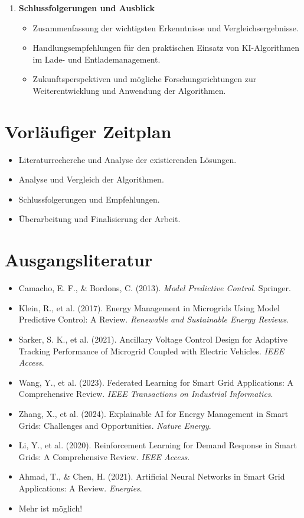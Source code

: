 \documentclass[12pt]{article} %
\begin{document}
\begin{enumerate}
    \item \textbf{Schlussfolgerungen und Ausblick}
        \begin{itemize}
            \item Zusammenfassung der wichtigsten Erkenntnisse und Vergleichsergebnisse.
            \item Handlungsempfehlungen für den praktischen Einsatz von KI-Algorithmen im Lade- und Entlademanagement.
            \item Zukunftsperspektiven und mögliche Forschungsrichtungen zur Weiterentwicklung und Anwendung der Algorithmen.
        \end{itemize}
        
\end{enumerate}




\section{Vorläufiger Zeitplan}

\begin{itemize}
\item Literaturrecherche und Analyse der existierenden Lösungen.
\item Analyse und Vergleich der Algorithmen.
\item Schlussfolgerungen und Empfehlungen.
\item Überarbeitung und Finalisierung der Arbeit.
\end{itemize}




\section{Ausgangsliteratur}

\begin{itemize}
    \item Camacho, E. F., & Bordons, C. (2013). \textit{Model Predictive Control}. Springer.
    \item Klein, R., et al. (2017). Energy Management in Microgrids Using Model Predictive Control: A Review. \textit{Renewable and Sustainable Energy Reviews}.
    \item Sarker, S. K., et al. (2021). Ancillary Voltage Control Design for Adaptive Tracking Performance of Microgrid Coupled with Electric Vehicles. \textit{IEEE Access}.
    \item Wang, Y., et al. (2023). Federated Learning for Smart Grid Applications: A Comprehensive Review. \textit{IEEE Transactions on Industrial Informatics}.
    \item Zhang, X., et al. (2024). Explainable AI for Energy Management in Smart Grids: Challenges and Opportunities. \textit{Nature Energy}.
    \item Li, Y., et al. (2020). Reinforcement Learning for Demand Response in Smart Grids: A Comprehensive Review. \textit{IEEE Access}.
    \item Ahmad, T., & Chen, H. (2021). Artificial Neural Networks in Smart Grid Applications: A Review. \textit{Energies}.
    \item Mehr ist möglich!
\end{itemize}
\end{document}
